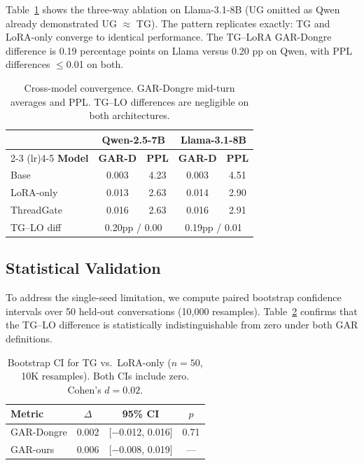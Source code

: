 \documentclass[11pt]{article}
\begin{document}
Table~\ref{tab:cross-model} shows the three-way ablation on Llama-3.1-8B (UG omitted as Qwen already demonstrated UG $\approx$ TG). The pattern replicates exactly: TG and LoRA-only converge to identical performance. The TG--LoRA GAR-Dongre difference is 0.19 percentage points on Llama versus 0.20 pp on Qwen, with PPL differences $\leq$0.01 on both.

\begin{table}[t]
\centering
\small
\begin{tabular}{lcccc}
\toprule
& \multicolumn{2}{c}{\textbf{Qwen-2.5-7B}} & \multicolumn{2}{c}{\textbf{Llama-3.1-8B}} \\
\cmidrule(lr){2-3} \cmidrule(lr){4-5}
\textbf{Model} & \textbf{GAR-D} & \textbf{PPL} & \textbf{GAR-D} & \textbf{PPL} \\
\midrule
Base & 0.003 & 4.23 & 0.003 & 4.51 \\
LoRA-only & 0.013 & 2.63 & 0.014 & 2.90 \\
ThreadGate & 0.016 & 2.63 & 0.016 & 2.91 \\
\midrule
TG--LO diff & \multicolumn{2}{c}{0.20pp / 0.00} & \multicolumn{2}{c}{0.19pp / 0.01} \\
\bottomrule
\end{tabular}
\caption{Cross-model convergence. GAR-Dongre mid-turn averages and PPL. TG--LO differences are negligible on both architectures.}
\label{tab:cross-model}
\end{table}

\subsection{Statistical Validation}

To address the single-seed limitation, we compute paired bootstrap confidence intervals over 50 held-out conversations (10,000 resamples). Table~\ref{tab:bootstrap} confirms that the TG--LO difference is statistically indistinguishable from zero under both GAR definitions.

\begin{table}[t]
\centering
\small
\begin{tabular}{lccc}
\toprule
\textbf{Metric} & \textbf{$\Delta$} & \textbf{95\% CI} & \textbf{$p$} \\
\midrule
GAR-Dongre & 0.002 & [$-$0.012, 0.016] & 0.71 \\
GAR-ours & 0.006 & [$-$0.008, 0.019] & --- \\
\bottomrule
\end{tabular}
\caption{Bootstrap CI for TG vs.\ LoRA-only ($n=50$, 10K resamples). Both CIs include zero. Cohen's $d = 0.02$.}
\label{tab:bootstrap}
\end{table}
\end{document}

